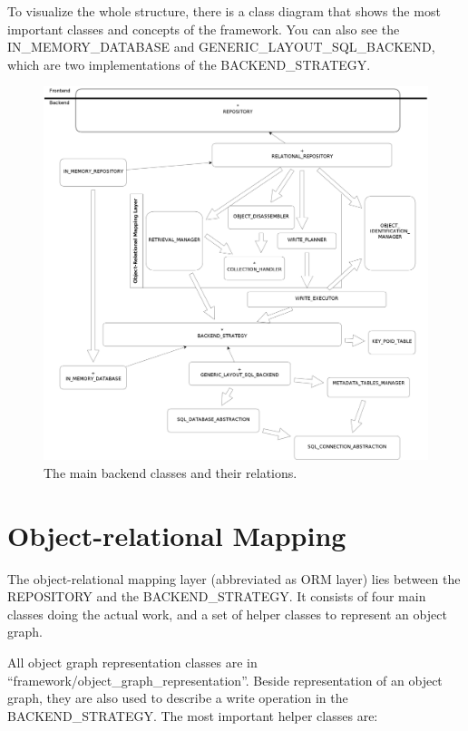 To visualize the whole structure, there is a class diagram that shows the most important classes and concepts of the framework. 
You can also see the IN\_MEMORY\_DATABASE and GENERIC\_LAYOUT\_SQL\_BACKEND, which are two implementations of the BACKEND\_STRATEGY.

\begin{figure} [h]
\centering
\includegraphics[trim= 0mm -10mm 0mm -10mm,clip, width = 13cm] {includes/backend.png}
\caption{The main backend classes and their relations.}
\label{fig:backend_classes}
\end{figure}


\section{Object-relational Mapping}
\label{section:ORM}

The object-relational mapping layer (abbreviated as ORM layer) lies between the REPOSITORY and the BACKEND\_STRATEGY.
It consists of four main classes doing the actual work, and a set of helper classes to represent an object graph.

All object graph representation classes are in ``framework/object\_graph\_representation''. 
Beside representation of an object graph, they are also used to describe a write operation in the BACKEND\_STRATEGY.
The most important helper classes are:


